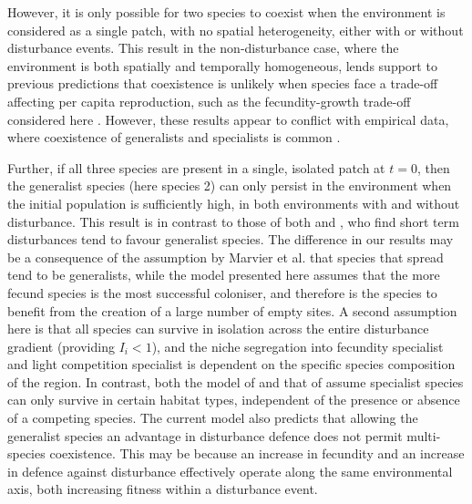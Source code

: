 However, it is only possible for two species to coexist when the environment is considered as a single patch, with no spatial heterogeneity, either with or without disturbance events. This result in the non-disturbance case, where the environment is both spatially and temporally homogeneous, lends support to previous predictions that coexistence is unlikely when species face a trade-off affecting per capita reproduction, such as the fecundity-growth trade-off considered here \citep{egas2004evolution}.
 However, these results appear to conflict with empirical data, where coexistence of generalists and specialists is common \citep[e.g.][]{morris1996coexistence,bonesi2004differential}. 
 
 Further, if all three species are present in a single, isolated patch at $t=0$, then the generalist species (here species 2) can only persist in the environment when the initial population is sufficiently high, in both environments with and without disturbance. This result is in contrast to those of both \cite{marvier2004habitat} and \cite{nagelkerke2013coexistence}, who find short term disturbances tend to favour generalist species. The difference in our results may be a consequence of the assumption by Marvier et al. that species that spread tend to be generalists, while the model presented here assumes that the more fecund species is the most successful coloniser, and therefore is the species to benefit from the creation of a large number of empty sites. A second assumption here is that all species can survive in isolation across the entire disturbance gradient (providing $I_i<1$), and the niche segregation into fecundity specialist and light competition specialist is dependent on the specific species composition of the region. In contrast, both the model of  \cite{marvier2004habitat} and that of \cite{nagelkerke2013coexistence} assume specialist species can only survive in certain habitat types, independent of the presence or absence of a competing species. The current model also predicts that allowing the generalist species an advantage in disturbance defence does not permit multi-species coexistence. This may be because an increase in fecundity and an increase in defence against disturbance effectively operate along the same environmental axis, both increasing fitness within a disturbance event.
 
